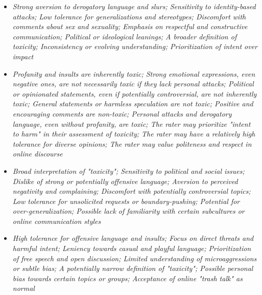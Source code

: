 \documentclass[11pt]{article}
\newcommand{\profiletext}[1]{\textit{#1}}
\begin{document}
\begin{itemize}
\item \profiletext{Strong aversion to derogatory language and slurs; Sensitivity to identity-based attacks; Low tolerance for generalizations and stereotypes; Discomfort with comments about sex and sexuality; Emphasis on respectful and constructive communication; Political or ideological leanings; A broader definition of toxicity; Inconsistency or evolving understanding; Prioritization of intent over impact}
\item \profiletext{Profanity and insults are inherently toxic; Strong emotional expressions, even negative ones, are not necessarily toxic if they lack personal attacks; Political or opinionated statements, even if potentially controversial, are not inherently toxic; General statements or harmless speculation are not toxic; Positive and encouraging comments are non-toxic; Personal attacks and derogatory language, even without profanity, are toxic; The rater may prioritize "intent to harm" in their assessment of toxicity; The rater may have a relatively high tolerance for diverse opinions; The rater may value politeness and respect in online discourse}
\item \profiletext{Broad interpretation of "toxicity"; Sensitivity to political and social issues; Dislike of strong or potentially offensive language; Aversion to perceived negativity and complaining; Discomfort with potentially controversial topics; Low tolerance for unsolicited requests or boundary-pushing; Potential for over-generalization; Possible lack of familiarity with certain subcultures or online communication styles}
\item \profiletext{High tolerance for offensive language and insults; Focus on direct threats and harmful intent; Leniency towards casual and playful language; Prioritization of free speech and open discussion; Limited understanding of microaggressions or subtle bias; A potentially narrow definition of "toxicity"; Possible personal bias towards certain topics or groups; Acceptance of online "trash talk" as normal}
\end{itemize}
\end{document}
